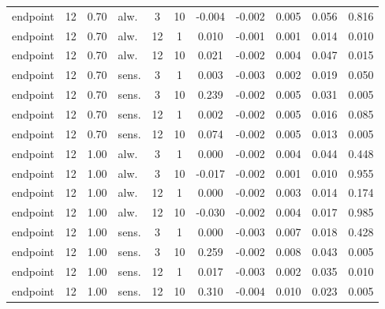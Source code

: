 \begin{scriptsize}
\begin{longtable}{l cclcc ccccc}
endpoint & 12 & 0.70 & alw. & 3 & 10 & -0.004 & -0.002 & 0.005 & 0.056 & 0.816 \\
endpoint & 12 & 0.70 & alw. & 12 & 1 & 0.010 & -0.001 & 0.001 & 0.014 & 0.010 \\
endpoint & 12 & 0.70 & alw. & 12 & 10 & 0.021 & -0.002 & 0.004 & 0.047 & 0.015 \\
endpoint & 12 & 0.70 & sens. & 3 & 1 & 0.003 & -0.003 & 0.002 & 0.019 & 0.050 \\
endpoint & 12 & 0.70 & sens. & 3 & 10 & 0.239 & -0.002 & 0.005 & 0.031 & 0.005 \\
endpoint & 12 & 0.70 & sens. & 12 & 1 & 0.002 & -0.002 & 0.005 & 0.016 & 0.085 \\
endpoint & 12 & 0.70 & sens. & 12 & 10 & 0.074 & -0.002 & 0.005 & 0.013 & 0.005 \\
endpoint & 12 & 1.00 & alw. & 3 & 1 & 0.000 & -0.002 & 0.004 & 0.044 & 0.448 \\
endpoint & 12 & 1.00 & alw. & 3 & 10 & -0.017 & -0.002 & 0.001 & 0.010 & 0.955 \\
endpoint & 12 & 1.00 & alw. & 12 & 1 & 0.000 & -0.002 & 0.003 & 0.014 & 0.174 \\
endpoint & 12 & 1.00 & alw. & 12 & 10 & -0.030 & -0.002 & 0.004 & 0.017 & 0.985 \\
endpoint & 12 & 1.00 & sens. & 3 & 1 & 0.000 & -0.003 & 0.007 & 0.018 & 0.428 \\
endpoint & 12 & 1.00 & sens. & 3 & 10 & 0.259 & -0.002 & 0.008 & 0.043 & 0.005 \\
endpoint & 12 & 1.00 & sens. & 12 & 1 & 0.017 & -0.003 & 0.002 & 0.035 & 0.010 \\
endpoint & 12 & 1.00 & sens. & 12 & 10 & 0.310 & -0.004 & 0.010 & 0.023 & 0.005 \\
\end{longtable}
\end{scriptsize}